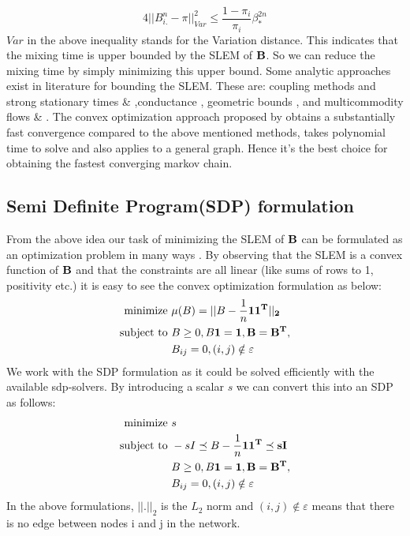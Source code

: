 \documentclass[runningheads,a4paper]{llncs}
\begin{document}
\begin{equation}
 4||B_{i.}^n - \pi||_{Var}^2 \leq \frac{1-\pi_i}{\pi_i} \beta_*^{2n}
\end{equation}
$Var$ in the above inequality stands for the Variation distance. This indicates that the mixing time is upper bounded by the SLEM of $\bf B$. So we can reduce the mixing time by simply minimizing this upper bound. Some analytic approaches exist in literature for bounding the SLEM. These are: coupling methods and strong stationary times \cite{aldous1983random} \& \cite{diaconis1988group},conductance \cite{jerrum1989approximating}, geometric bounds \cite{diaconis1991geometric}, and multicommodity flows \cite{sinclair1992improved} \& \cite{kahale1997semidefinite}. The convex optimization approach proposed by \cite{Boyd03fastestmixing} obtains a substantially fast convergence compared to the above mentioned methods, takes polynomial time to solve and also applies to a general graph. Hence it's the best choice for obtaining the fastest converging markov chain.

\subsection{Semi Definite Program(SDP) formulation}

From the above idea our task of minimizing the SLEM of $\bf B$ can be formulated as an optimization problem in many ways \cite{Boyd03fastestmixing}. By observing that the SLEM is a convex function of $\bf B$ and that the constraints are all linear (like sums of rows to 1, positivity etc.) it is easy to see the convex optimization formulation as below:
\begin{align}
\text{minimize }& \mu(B) = || B-\frac{1}{n} \bf 1 \bf 1^T ||_2 \nonumber \\
\text{subject to }& B \geq 0, B \bf {1} = \bf {1}, B = B^T, \nonumber \\
& B_{ij} = 0, (i,j) \notin \varepsilon 
\end{align} 
We work with the SDP formulation as it could be solved efficiently with the available sdp-solvers. By introducing a scalar $s$ we can convert this into an SDP as follows:
\begin{align}
\text{minimize }& s \nonumber \\
\text{subject to }& -s I \preceq B-\frac{1}{n} \bf 1 \bf 1^T \preceq s I \nonumber \\
&B \geq 0, B \bf {1} = \bf {1}, B = B^T, \nonumber \\
& B_{ij} = 0, (i,j) \notin \varepsilon 
\end{align} 
In the above formulations, $||.||_2$ is the $L_2$ norm and $(i,j) \notin \varepsilon$ means that there is no edge between nodes i and j in the network.
\end{document}
